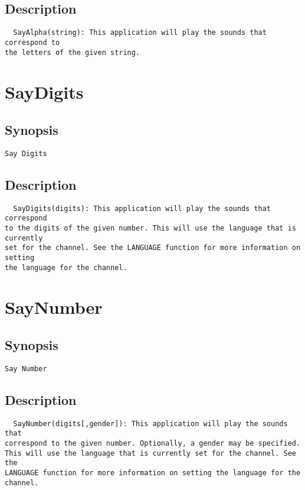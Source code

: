 \subsection{Description}
\begin{verbatim}
  SayAlpha(string): This application will play the sounds that correspond to
the letters of the given string.

\end{verbatim}


\section{SayDigits}
\subsection{Synopsis}
\begin{verbatim}
Say Digits
\end{verbatim}
\subsection{Description}
\begin{verbatim}
  SayDigits(digits): This application will play the sounds that correspond
to the digits of the given number. This will use the language that is currently
set for the channel. See the LANGUAGE function for more information on setting
the language for the channel.

\end{verbatim}


\section{SayNumber}
\subsection{Synopsis}
\begin{verbatim}
Say Number
\end{verbatim}
\subsection{Description}
\begin{verbatim}
  SayNumber(digits[,gender]): This application will play the sounds that
correspond to the given number. Optionally, a gender may be specified.
This will use the language that is currently set for the channel. See the
LANGUAGE function for more information on setting the language for the channel.

\end{verbatim}


